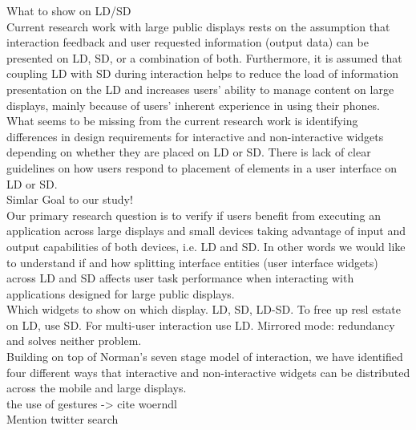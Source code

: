 What to show on LD/SD\\
Current research work with large public displays rests on the assumption that
interaction feedback and user requested information (output data) can be
presented on LD, SD, or a combination of both. Furthermore, it is assumed that
coupling LD with SD during interaction helps to reduce the load of information presentation on the LD and increases users’ ability to manage content on large displays, mainly because of users’ inherent experience in using their phones. What seems to be missing from the current research work is identifying differences in design requirements for interactive and non-interactive widgets depending on whether they are placed on LD or SD. There is lack of clear guidelines on how users respond to placement of elements in a user interface on LD or SD.\\

Simlar Goal to our study!\\
Our primary research question is to verify if users benefit from executing an
application across large displays and small devices taking advantage of input
and output capabilities of both devices, i.e. LD and SD. In other words we would
like to understand if and how splitting interface entities (user interface widgets) across LD and SD affects user task performance when interacting with applications designed for large public displays.\\

Which widgets to show on which display. LD, SD, LD-SD. To free up resl estate on
LD, use SD.
For multi-user interaction use LD. Mirrored mode: redundancy and solves neither
problem.\\
Building on top of Norman’s seven stage model of interaction, we have identified
four different ways that interactive and non-interactive widgets can be
distributed across the mobile and large displays.\\


the use of gestures -> cite woerndl \cite{woerndl2012combining}\\

Mention twitter search \cite{radle2013twistersearch}

